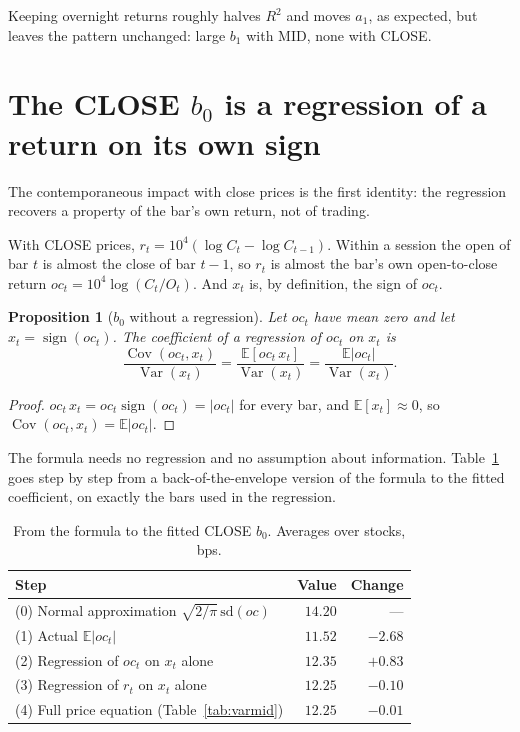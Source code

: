 \documentclass[11pt,a4paper]{article}
\newtheorem{proposition}{Proposition}
\newcommand{\E}{\mathbb{E}}
\begin{document}
Keeping overnight returns roughly halves $R^2$ and moves $a_1$, as expected, but leaves the pattern
unchanged: large $b_1$ with MID, none with CLOSE.

\section{The CLOSE $b_0$ is a regression of a return on its own sign}
\label{sec:b0}

The contemporaneous impact with close prices is the first identity: the regression recovers a property of the bar's own return, not of trading.


With CLOSE prices, $r_t = 10^4(\log C_t - \log C_{t-1})$. Within a session the open of bar $t$ is almost
the close of bar $t-1$, so $r_t$ is almost the bar's own open-to-close return $oc_t = 10^4\log(C_t/O_t)$.
And $x_t$ is, by definition, the sign of $oc_t$.

\begin{proposition}[$b_0$ without a regression]
\label{prop:b0}
Let $oc_t$ have mean zero and let $x_t=\operatorname{sign}(oc_t)$. The coefficient of a regression of
$oc_t$ on $x_t$ is
\[
\frac{\operatorname{Cov}(oc_t,x_t)}{\operatorname{Var}(x_t)} = \frac{\E[oc_t\,x_t]}{\operatorname{Var}(x_t)}
= \frac{\E|oc_t|}{\operatorname{Var}(x_t)} .
\]
\end{proposition}
\begin{proof}
$oc_t\,x_t = oc_t\operatorname{sign}(oc_t)=|oc_t|$ for every bar, and $\E[x_t]\approx0$, so
$\operatorname{Cov}(oc_t,x_t)=\E|oc_t|$.
\end{proof}

The formula needs no regression and no assumption about information. Table~\ref{tab:ladder} goes step
by step from a back-of-the-envelope version of the formula to the fitted coefficient, on exactly the
bars used in the regression.

\begin{table}[htbp]
\centering
\caption{From the formula to the fitted CLOSE $b_0$. Averages over stocks, bps.}
\label{tab:ladder}
\small
\begin{tabular}{@{}lrr@{}}
\toprule
Step & Value & Change \\
\midrule
(0) Normal approximation $\sqrt{2/\pi}\,\mathrm{sd}(oc)$ & $14.20$ & --- \\
(1) Actual $\E|oc_t|$ & $11.52$ & $-2.68$ \\
(2) Regression of $oc_t$ on $x_t$ alone & $12.35$ & $+0.83$ \\
(3) Regression of $r_t$ on $x_t$ alone & $12.25$ & $-0.10$ \\
(4) Full price equation (Table~\ref{tab:varmid}) & $12.25$ & $-0.01$ \\
\bottomrule
\end{tabular}
\end{table}
\end{document}
